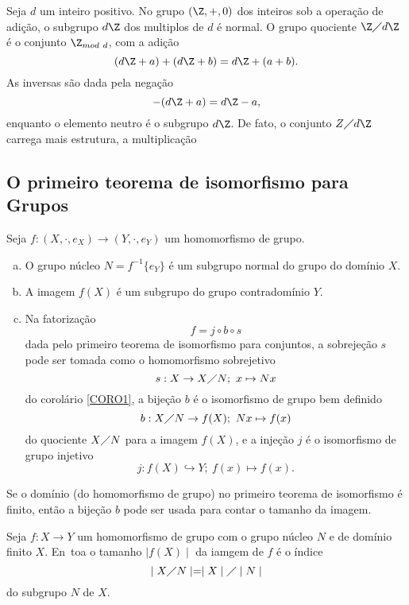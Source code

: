          \begin{exmp}
            Seja $d$ um inteiro positivo. No grupo $(\Z, +, 0)$ dos inteiros sob a operação de adição, o subgrupo $d\Z$ dos multiplos de $d$ é normal. O grupo quociente $\Z \diagup d\Z$ é o conjunto $\Z_{mod\ d}$, com a adição
            $$(d\Z + a) + (d\Z + b) = d\Z + (a + b).$$ As inversas são dada pela negação $$-(d\Z + a) = d\Z - a,$$ enquanto o elemento neutro é o subgrupo $d\Z$.
            De fato, o conjunto $Z\diagup d\Z$ carrega mais estrutura, a multiplicação
         \end{exmp}

   \subsection{O primeiro teorema de isomorfismo para Grupos}
      \begin{theorem}
         Seja $f: (X, \cdot, e_{X}) \to (Y, \cdot, e_{Y})$ um homomorfismo de grupo.
         \begin{enumerate}[(a)]
            \item O grupo núcleo $N = f^{-1}\{e_{Y}\}$ é um subgrupo normal do grupo do domínio $X$.
            \item A imagem $f(X)$ é um subgrupo do grupo contradomínio $Y$.
            \item Na fatorização $$f = j \circ b \circ s$$ dada pelo primeiro teorema de isomorfismo para conjuntos, a sobrejeção $s$ pode ser tomada como o homomorfismo sobrejetivo $$s: X\to X\diagup N;\ x\mapsto Nx$$ do corolário \ref{CORO1}, a bijeção $b$ é o isomorfismo de grupo bem definido $$b: X\diagup N \to f(X);\ Nx \mapsto f(x)$$ do quociente $X\diagup N$ para a imagem $f(X)$, e a injeção $j$ é o isomorfismo de grupo injetivo $$j: f(X) \hookrightarrow Y;\ f(x) \mapsto f(x).$$
         \end{enumerate}
         Se o domínio (do homomorfismo de grupo) no primeiro teorema de isomorfismo é finito, então a bijeção $b$ pode ser usada para contar o tamanho da imagem.
      \end{theorem}
      \begin{corollary}\label{GHOMO}
         Seja $f: X\to Y$ um homomorfismo de grupo com o grupo núcleo $N$ e de domínio finito $X$. En~toa o tamanho $\mid f(X) \mid$ da iamgem de $f$ é o índice $$\mid X\diagup N\mid = \mid X \mid \diagup \mid N \mid$$ do subgrupo $N$ de $X$.
      \end{corollary}
